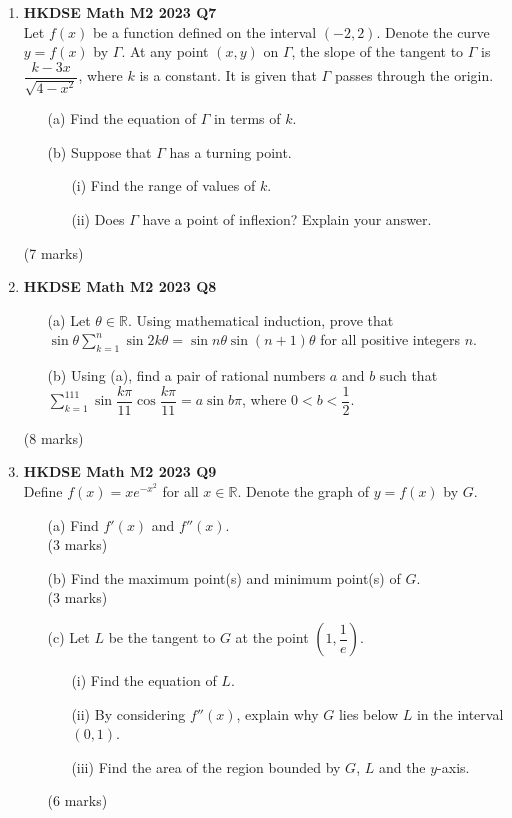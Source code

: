 \documentclass[12pt]{article}
\begin{document}
\begin{enumerate}
	\item \textbf{HKDSE Math M2 2023 Q7}\\
	Let $f(x)$ be a function defined on the interval $(-2,2)$. Denote the curve $y = f(x)$ by $\Gamma$. At any point $(x,y)$ on $\Gamma$, the slope of the tangent to $\Gamma$ is $\dfrac{k - 3x}{\sqrt{4-x^2}}$, where $k$ is a constant. It is given that $\Gamma$ passes through the origin.
	\begin{enumerate}
		\item [(a)]Find the equation of $\Gamma$ in terms of $k$.
		\item [(b)]Suppose that $\Gamma$ has a turning point.
		\begin{enumerate}
			\item [(i)]Find the range of values of $k$.
			\item [(ii)]Does $\Gamma$ have a point of inflexion? Explain your answer.
		\end{enumerate}
	\end{enumerate}
	(7 marks)

	\item \textbf{HKDSE Math M2 2023 Q8}
	\begin{enumerate}
		\item [(a)]Let $\theta \in \mathbb{R}$. Using mathematical induction, prove that $\displaystyle \sin{\theta}\sum_{k=1}^{n}\sin{2k\theta} = \sin{n\theta}\sin{(n+1)\theta}$ for all positive integers $n$.
		\item [(b)] Using (a), find a pair of rational numbers $a$ and $b$ such that $\displaystyle\sum_{k = 1}^{111}\sin{\dfrac{k\pi}{11}}\cos{\dfrac{k\pi}{11}} = a\sin{b\pi}$, where $0 < b < \dfrac{1}{2}$.
	\end{enumerate}
	(8 marks)

	\item \textbf{HKDSE Math M2 2023 Q9}\\
	Define $ f(x) = xe^{-x^2}$ for all $x\in \mathbb{R}$. Denote the graph of $y = f(x)$ by $G$.
	\begin{enumerate}
		\item [(a)]Find $f'(x)$ and $f''(x)$. \\(3 marks)
		\item [(b)]Find the maximum point(s) and minimum point(s) of $G$. \\(3 marks)
		\item [(c)]Let $L$ be the tangent to $G$ at the point $\left(1,\dfrac{1}{e}\right)$.
		\begin{enumerate}
			\item [(i)]Find the equation of $L$.
			\item [(ii)]By considering $f''(x)$, explain why $G$ lies below $L$ in the interval $(0,1)$.
			\item [(iii)]Find the area of the region bounded by $G$, $L$ and the $y$-axis.
		\end{enumerate}
		(6 marks)
	\end{enumerate}


\end{enumerate}
\end{document}
